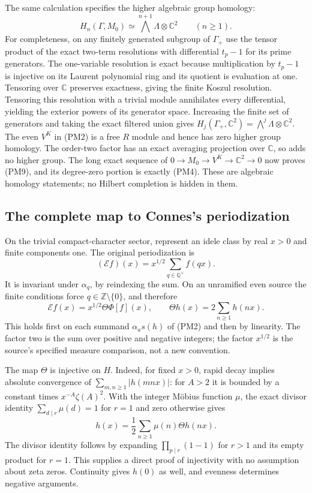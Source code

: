 The same calculation specifies the higher algebraic group
homology:
\[
 H_n(\Gamma,M_0)\simeq
       \bigwedge^{n+1}\Lambda\otimes\mathbb C^2
       \qquad(n\ge1).
 \tag{PM9}
\]
For completeness, on any finitely generated subgroup of
$\Gamma_+$ use the tensor product of the exact two-term
resolutions with differential $t_p-1$ for its prime generators.
The one-variable resolution is exact because multiplication
by $t_p-1$ is injective on its Laurent polynomial ring and
its quotient is evaluation at one. Tensoring over $\mathbb C$
preserves exactness, giving the finite Koszul resolution.
Tensoring this resolution with a trivial module annihilates
every differential, yielding the exterior powers of its
generator space. Increasing the finite set of generators
and taking the exact filtered union gives
$H_j(\Gamma_+,\mathbb C^2)=\bigwedge^j\Lambda\otimes\mathbb C^2$.
The even $V^K$ in (PM2) is a free $R$ module and hence has
zero higher group homology. The order-two factor has an exact
averaging projection over $\mathbb C$, so adds no higher group.
The long exact sequence of
$0\to M_0\to V^K\to\mathbb C^2\to0$ now proves (PM9),
and its degree-zero portion is exactly (PM4).
These are algebraic homology statements; no Hilbert completion
is hidden in them.

\subsection{The complete map to Connes's periodization}

On the trivial compact-character sector, represent an idele
class by real $x>0$ and finite components one. The original
periodization is
\[
 (\mathcal E f)(x)=x^{1/2}\sum_{q\in\mathbb Q^\times}f(qx).
 \tag{PM10}
\]
It is invariant under $\alpha_q$, by reindexing the sum. On
an unramified even source the finite conditions force
$q\in\mathbb Z\setminus\{0\}$, and therefore
\[
 \mathcal E f(x)=x^{1/2}\Theta\Phi[f](x),\qquad
 \Theta h(x)=2\sum_{n\ge1}h(nx).
 \tag{PM11}
\]
This holds first on each summand $\alpha_a s(h)$ of (PM2)
and then by linearity. The factor two is the sum over positive
and negative integers; the factor $x^{1/2}$ is the source's
specified measure comparison, not a new convention.

The map $\Theta$ is injective on $H$. Indeed, for fixed $x>0$,
rapid decay implies absolute convergence of
$\sum_{m,n\ge1}|h(mnx)|$: for $A>2$ it is bounded by
a constant times $x^{-A}\zeta(A)^2$. With the integer Möbius
function $\mu$, the exact divisor identity
$\sum_{d\mid r}\mu(d)=1$ for $r=1$ and zero otherwise gives
\[
 h(x)=\frac12\sum_{n\ge1}\mu(n)\Theta h(nx).
 \tag{PM12}
\]
The divisor identity follows by expanding
$\prod_{p\mid r}(1-1)$ for $r>1$ and its empty product for
$r=1$. This supplies a direct proof of injectivity with no
assumption about zeta zeros. Continuity gives $h(0)$ as well,
and evenness determines negative arguments.

